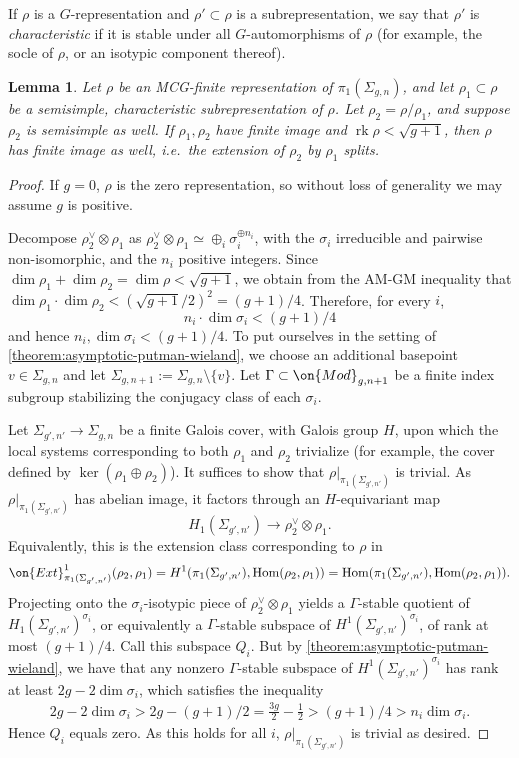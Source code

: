 \documentclass[12 pt]{amsart}
\theoremstyle{plain}
\newtheorem{lemma}[subsubsection]{Lemma}
\theoremstyle{definition}
\theoremstyle{remark}
\numberwithin{equation}{section}
\DeclareMathOperator\rk{rk}
\DeclareMathOperator\Hom{Hom}
\begin{document}
If $\rho$ is a $G$-representation and $\rho'\subset \rho$ is a subrepresentation, we say that $\rho'$ is \emph{characteristic} if it is stable under all $G$-automorphisms of $\rho$ (for example, the socle of $\rho$, or an isotypic component thereof).
\begin{lemma}
	\label{lemma:semisimplicity}
Let $\rho$ be an MCG-finite representation of $\pi_1(\Sigma_{g,n})$, and let $\rho_1\subset\rho$ be a semisimple, characteristic subrepresentation of $\rho$. Let $\rho_2=\rho/\rho_1$, and suppose $\rho_2$ is semisimple as well. If $\rho_1, \rho_2$ have finite image and $\rk\rho<\sqrt{g+1}$, then $\rho$ has finite image as well, i.e.~the extension of $\rho_2$ by $\rho_1$ splits.
\end{lemma}
\begin{proof}
If $g=0$, $\rho$ is the zero representation, so without loss of generality we may assume $g$ is positive.

	Decompose $\rho_2^\vee \otimes \rho_1$ as $\rho_2^\vee \otimes \rho_1 \simeq \oplus_i \sigma_i^{\oplus n_i}$, with the $\sigma_i$ irreducible and pairwise non-isomorphic, and the $n_i$ positive integers.
	Since $\dim \rho_1 + \dim \rho_2 = \dim \rho < \sqrt{g+1}$, 
	we obtain from the AM-GM inequality that $\dim \rho_1 \cdot \dim \rho_2
	< (\sqrt{g+1}/2)^2 = (g+1)/4$. Therefore, for every $i$, $$n_i \cdot \dim
	\sigma_i < (g+1)/4$$
	and hence $n_i, \dim\sigma_i < (g+1)/4$. 
	To put ourselves in the setting of 
	\autoref{theorem:asymptotic-putman-wieland}, we choose an additional
	basepoint $v \in \Sigma_{g,n}$ and let $\Sigma_{g,n+1} := \Sigma_{g,n} \setminus\{v\}$. Let $\Gamma\subset \on{Mod}_{g, n+1}$ be a finite index subgroup stabilizing the conjugacy class of each $\sigma_i$.

	Let $\Sigma_{g',n'} \to \Sigma_{g,n}$ be a finite Galois cover, with Galois group $H$, upon which the local
	systems corresponding to both
	$\rho_1$ and $\rho_2$ trivialize (for example, the cover defined by $\ker(\rho_1\oplus\rho_2)$).
	It suffices to show that $\rho|_{\pi_1(\Sigma_{g',n'})}$ is trivial. As
	$\rho|_{\pi_1(\Sigma_{g',n'})}$ has abelian image, it factors through an
	$H$-equivariant map $$H_1(\Sigma_{g',n'})\to \rho_2^\vee\otimes
	\rho_1.$$ Equivalently, this is the extension class corresponding to
	$\rho$ in $$\on{Ext}^1_{\pi_1(\Sigma_{g', n'})}(\rho_2,
	\rho_1)=H^1(\pi_1(\Sigma_{g', n'}), \Hom(\rho_2,
	\rho_1))=\Hom(\pi_1(\Sigma_{g', n'}), \Hom(\rho_2, \rho_1)).$$
	Projecting onto the $\sigma_i$-isotypic piece of $\rho_2^\vee\otimes
	\rho_1$ yields a $\Gamma$-stable quotient of
	$H_1(\Sigma_{g',n'})^{\sigma_i}$, or equivalently a $\Gamma$-stable
	subspace of $H^1(\Sigma_{g',n'})^{\sigma_i}$, of rank at most $(g+1)/4$.
	Call this subspace $Q_i$.
	But by
	\autoref{theorem:asymptotic-putman-wieland}, we have that any nonzero
	$\Gamma$-stable subspace of $H^1(\Sigma_{g',n'})^{\sigma_i}$ has rank at
	least $2g-2\dim \sigma_i$, which satisfies the inequality
	\begin{align*}
		2g-2\dim \sigma_i >2g-(g+1)/2=\frac{3g}{2}-\frac{1}{2}>(g+1)/4
		> n_i \dim \sigma_i.
	\end{align*}
	Hence $Q_i$ equals zero. As this holds for all $i$, $\rho|_{\pi_1(\Sigma_{g',n'})}$ is trivial as desired.
\end{proof}
\end{document}
